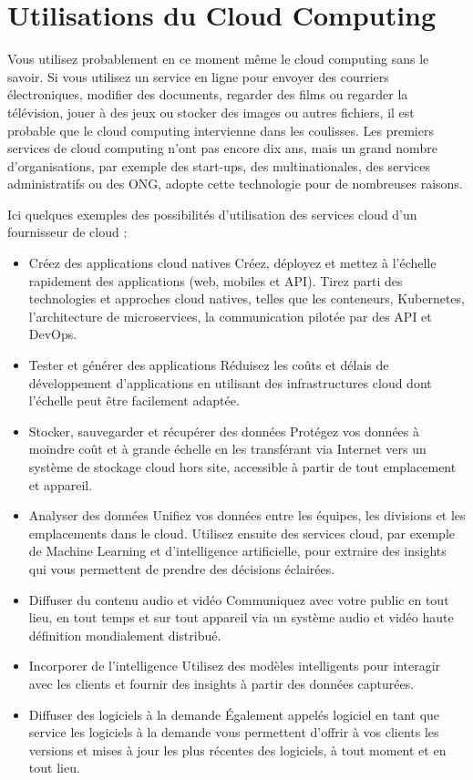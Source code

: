 \section{Utilisations du Cloud Computing}
Vous utilisez probablement en ce moment même le cloud computing sans le savoir. Si vous utilisez un service en ligne pour envoyer des courriers électroniques, modifier des documents, regarder des films ou regarder la télévision, jouer à des jeux ou stocker des images ou autres fichiers, il est probable que le cloud computing intervienne dans les coulisses. Les premiers services de cloud computing n’ont pas encore dix ans, mais un grand nombre d’organisations, par exemple des start-ups, des multinationales, des services administratifs ou des ONG, adopte cette technologie pour de nombreuses raisons.

Ici quelques exemples des possibilités d’utilisation des services cloud d’un fournisseur de cloud :

\begin{itemize}[label=\textbullet]
\item Créez des applications cloud natives Créez, déployez et mettez à l’échelle rapidement des applications (web, mobiles et API). Tirez parti des technologies et approches cloud natives, telles que les conteneurs, Kubernetes, l’architecture de microservices, la communication pilotée par des API et DevOps.
\item Tester et générer des applications Réduisez les coûts et délais de développement d’applications en utilisant des infrastructures cloud dont l’échelle peut être facilement adaptée.
\item Stocker, sauvegarder et récupérer des données Protégez vos données à moindre coût et à grande échelle en les transférant via Internet vers un système de stockage cloud hors site, accessible à partir de tout emplacement et appareil.
\item Analyser des données Unifiez vos données entre les équipes, les divisions et les emplacements dans le cloud. Utilisez ensuite des services cloud, par exemple de Machine Learning et d’intelligence artificielle, pour extraire des insights qui vous permettent de prendre des décisions éclairées.
\item Diffuser du contenu audio et vidéo Communiquez avec votre public en tout lieu, en tout temps et sur tout appareil via un système audio et vidéo haute définition mondialement distribué.
\item Incorporer de l’intelligence Utilisez des modèles intelligents pour interagir avec les clients et fournir des insights à partir des données capturées.
\item Diffuser des logiciels à la demande Également appelés logiciel en tant que service les logiciels à la demande vous permettent d’offrir à vos clients les versions et mises à jour les plus récentes des logiciels, à tout moment et en tout lieu.
\end{itemize}